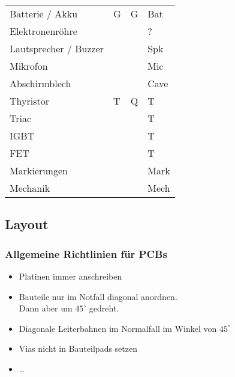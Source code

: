 \begin{table}[h!]
\begin{tabular}{llll}
  \rowcolor{lgray}  Batterie / Akku         & G     & G     & Bat \\
  \rowcolor{white}  Elektronenröhre         &       &       & ? \\
  \rowcolor{lgray}  Lautsprecher / Buzzer   &       &       & Spk \\
  \rowcolor{white}  Mikrofon                &       &       & Mic \\
  \rowcolor{lgray}  Abschirmblech           &       &       & Cave \\
  \rowcolor{white}  Thyristor               & T     & Q     & T \\
  \rowcolor{lgray}  Triac                   &       &       & T \\
  \rowcolor{white}  IGBT                    &       &       & T \\
  \rowcolor{lgray}  FET                     &       &       & T \\
  \rowcolor{white}  Markierungen            &       &       & Mark \\
  \rowcolor{lgray}  Mechanik                &       &       & Mech
  \end{tabular}
\end{table}

\subsection{Layout}

\subsubsection{Allgemeine Richtlinien für PCBs}
\begin{itemize}
  \item Platinen immer anschreiben
  \item Bauteile nur im Notfall diagonal anordnen. \\
        Dann aber um $45^\circ$ gedreht. 
  \item Diagonale Leiterbahnen im Normalfall im Winkel von $45^\circ$
  \item Vias nicht in Bauteilpads setzen
  \item \dots
\end{itemize}